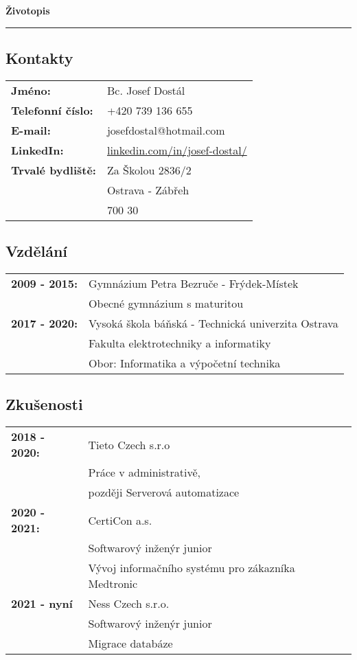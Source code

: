 \documentclass[a4paper]{article}
\begin{document}
\begin{center}
    \huge{\textbf{Životopis}}
    \par\noindent\rule{\textwidth}{0.4pt}
\end{center}

\subsection*{Kontakty}
\begin{tabular}{>{\bfseries}l l}
    Jméno:           & Bc. Josef Dostál \\
    Telefonní číslo: & +420 739 136 655 \\
    E-mail:          & josefdostal@hotmail.com \\
    LinkedIn:        & \href {https://www.linkedin.com/in/josef-dostal/}
                             {linkedin.com/in/josef-dostal/} \\
    Trvalé bydliště: & Za Školou 2836/2 \\
                     & Ostrava - Zábřeh \\
                     & 700 30
\end{tabular}

\subsection*{Vzdělání}
\begin{tabular}{>{\bfseries}l l}
    2009 - 2015: & Gymnázium Petra Bezruče - Frýdek-Místek \\
                 & Obecné gymnázium s maturitou \\
    2017 - 2020: & Vysoká škola báňská - Technická univerzita Ostrava \\
                 & Fakulta elektrotechniky a informatiky \\
                 & Obor: Informatika a výpočetní technika \\
\end{tabular}

\subsection*{Zkušenosti}
\begin{tabular}{>{\bfseries}l l}
    2018 - 2020: & Tieto Czech s.r.o \\
                 & Práce v administrativě, \\
                 & později Serverová automatizace \\
    2020 - 2021: & CertiCon a.s. \\
                 & Softwarový inženýr junior  \\
                 & Vývoj informačního systému pro zákazníka Medtronic \\
    2021 - nyní  & Ness Czech s.r.o. \\
                 & Softwarový inženýr junior \\
                 & Migrace databáze \\
\end{tabular}
\end{document}
